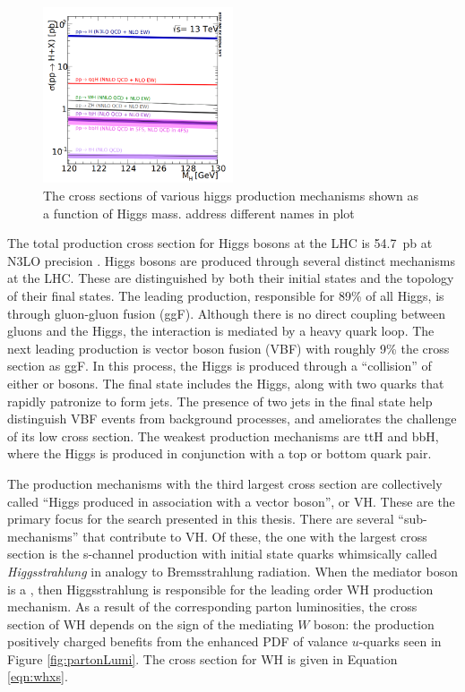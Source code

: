 \begin{figure}[h!]
\captionsetup[subfigure]{position=b}
\centering
\includegraphics[width=0.5\textwidth]{figures/pheno/higgsXsec.png}
\caption{The cross sections of various higgs production mechanisms shown as a function of Higgs mass. {\color{red} address different names in plot} \cite{higgsCross}}
\label{fig:higgsCrossSection}
\end{figure}

The total production cross section for Higgs bosons at the LHC is 54.7~pb at N3LO precision \cite{higgsCross}.
Higgs bosons are produced through several distinct mechanisms at the LHC.
These are distinguished by both their initial states and the topology of their final states.
The leading production, responsible for 89\% of all Higgs, is through gluon-gluon fusion (ggF).
Although there is no direct coupling between gluons and the Higgs, the interaction is mediated by a heavy quark loop.
The next leading production is vector boson fusion (VBF) with roughly 9\% the cross section as ggF.
In this process, the Higgs is produced through a ``collision'' of either \W or \Z bosons.
The final state includes the Higgs, along with two quarks that rapidly patronize to form jets.
The presence of two jets in the final state help distinguish VBF events from background processes, and ameliorates the challenge of its low cross section.
The weakest production mechanisms are ttH and bbH, where the Higgs is produced in conjunction with a top or bottom quark pair.

The production mechanisms with the third largest cross section are collectively called ``Higgs produced in association with a vector boson'', or VH.
These are the primary focus for the \hmm search presented in this thesis.
There are several ``sub-mechanisms'' that contribute to VH.
Of these, the one with the largest cross section is the s-channel production with initial state quarks whimsically called \emph{Higgsstrahlung} in analogy to Bremsstrahlung radiation.
When the mediator boson is a \W, then Higgsstrahlung is responsible for the leading order WH production mechanism.
As a result of the corresponding parton luminosities, the cross section of WH depends on the sign of the mediating $W$ boson: the production positively charged \Wp benefits from the enhanced PDF of valance $u$-quarks seen in Figure \ref{fig:partonLumi}. \check
The cross section for WH is given in Equation \ref{eqn:whxs}.

